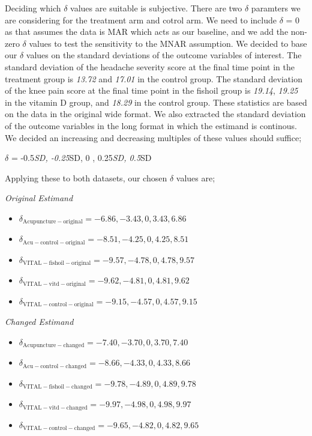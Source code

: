 \documentclass{article}
\providecommand{\tightlist}{%
  \setlength{\itemsep}{0pt}\setlength{\parskip}{0pt}}
\begin{document}
Deciding which \(\delta\) values are suitable is subjective. There are
two \(\delta\) paramters we are considering for the treatment arm and
cotrol arm. We need to include \(\delta\) = 0 as that assumes the data
is MAR which acts as our baseline, and we add the non-zero \(\delta\)
values to test the sensitivity to the MNAR assumption. We decided to
base our \(\delta\) values on the standard deviations of the outcome
variables of interest. The standard deviation of the headache severity
score at the final time point in the treatment group is \emph{13.72} and
\emph{17.01} in the control group. The standard deviation of the knee
pain score at the final time point in the fishoil group is \emph{19.14},
\emph{19.25} in the vitamin D group, and \emph{18.29} in the control
group. These statistics are based on the data in the original wide
format. We also extracted the standard deviation of the outcome
variables in the long format in which the estimand is continous. We
decided an increasing and decreasing multiples of these values should
suffice;

\(\delta\) = -0.5\emph{SD, -0.25}SD, 0 , 0.25\emph{SD, 0.5}SD

Applying these to both datasets, our chosen \(\delta\) values are;

\emph{Original Estimand}

\begin{itemize}
\tightlist
\item
  \(\delta_\mathrm{Acupuncture-original} = -6.86, -3.43, 0, 3.43, 6.86\)\\
\item
  \(\delta_\mathrm{Acu-control-original} = -8.51, -4.25, 0, 4.25, 8.51\)\\
\item
  \(\delta_\mathrm{VITAL-fishoil-original} = -9.57, -4.78, 0, 4.78, 9.57\)\\
\item
  \(\delta_\mathrm{VITAL-vitd-original} = -9.62, -4.81, 0, 4.81, 9.62\)\\
\item
  \(\delta_\mathrm{VITAL-control-original} = -9.15, -4.57, 0, 4.57, 9.15\)
\end{itemize}

\emph{Changed Estimand}

\begin{itemize}
\tightlist
\item
  \(\delta_\mathrm{Acupuncture-changed} = -7.40, -3.70, 0, 3.70, 7.40\)\\
\item
  \(\delta_\mathrm{Acu-control-changed} = -8.66, -4.33, 0, 4.33, 8.66\)\\
\item
  \(\delta_\mathrm{VITAL-fishoil-changed} = -9.78, -4.89, 0, 4.89, 9.78\)\\
\item
  \(\delta_\mathrm{VITAL-vitd-changed} = -9.97, -4.98, 0, 4.98, 9.97\)\\
\item
  \(\delta_\mathrm{VITAL-control-changed} = -9.65, -4.82, 0, 4.82, 9.65\)
\end{itemize}
\end{document}

